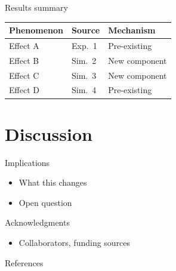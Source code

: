 \documentclass[aspectratio=169,11pt]{beamer}
\begin{document}
\begin{frame}{Results summary}
  \small
  \renewcommand{\arraystretch}{1.15}
  \begin{tabular}{lll}
    \textbf{Phenomenon} & \textbf{Source} & \textbf{Mechanism} \\
    \hline
    Effect A            & Exp.~1          & Pre-existing        \\
    Effect B            & Sim.~2          & {\color{novelred}New component} \\
    Effect C            & Sim.~3          & {\color{novelred}New component} \\
    Effect D            & Sim.~4          & Pre-existing        \\
  \end{tabular}
\end{frame}

\section{Discussion}

\begin{frame}{Implications}
  \begin{itemize}
    \item What this changes
    \item Open question
  \end{itemize}
\end{frame}

\begin{frame}{Acknowledgments}
  \begin{itemize}
    \item Collaborators, funding sources
  \end{itemize}
\end{frame}

\begin{frame}[allowframebreaks]{References}
  
  
\end{frame}
\end{document}
